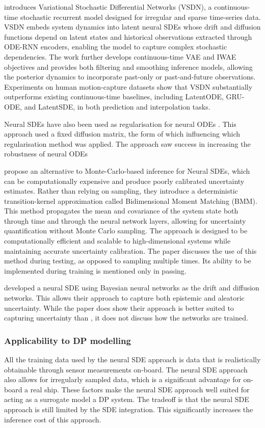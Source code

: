 \textcite{liuContinuousTimeStochasticDifferential2021} introduces Variational Stochastic Differential Networks (VSDN), a
continuous-time stochastic recurrent model designed for irregular and sparse time-series data. VSDN embeds system
dynamics into latent neural SDEs whose drift and diffusion functions depend on latent states and historical observations
extracted through ODE-RNN encoders, enabling the model to capture complex stochastic dependencies. The work further
develops continuous-time VAE and IWAE objectives and provides both filtering and smoothing inference models, allowing
the posterior dynamics to incorporate past-only or past-and-future observations. Experiments on human motion-capture
datasets show that VSDN substantially outperforms existing continuous-time baselines, including LatentODE, GRU-ODE, and
LatentSDE, in both prediction and interpolation tasks.

Neural SDEs have also been used as regularisation for neural ODEs \parencite{liuHowDoesNoise2020}. This approach used a
fixed diffusion matrix, the form of which influencing which regularisation method was applied. The approach saw success
in increasing the robustness of neural ODEs

\textcite{lookDeterministicApproximationNeural2023} propose an alternative to Monte-Carlo-based inference for Neural
SDEs, which can be computationally expensive and produce poorly calibrated uncertainty estimates. Rather than relying on
sampling, they introduce a deterministic transition-kernel approximation called Bidimensional Moment Matching (BMM).
This method propagates the mean and covariance of the system state both through time and through the neural network
layers, allowing for uncertainty quantification without Monte Carlo sampling. The approach is designed to be
computationally efficient and scalable to high-dimensional systems while maintaining accurate uncertainty calibration.
The paper discusses the use of this method during testing, as opposed to sampling multiple times. Its ability to be
implemented during training is mentioned only in passing. 

\textcite{lookDifferentialBayesianNeural2019} developed a neural SDE using Bayesian neural networks as the drift and
diffusion networks. This allows their approach to capture both epistemic and aleatoric uncertainty. While the paper does
show their approach is better suited to capturing uncertainty than \parencite{liuHowDoesNoise2020}, it does not discuss
how the networks are trained.

\subsubsection{Applicability to DP modelling}
All the training data used by the neural SDE approach is data that is realistically obtainable through sensor
measurements on-board. The neural SDE approach also allows for irregularly sampled data, which is a significant
advantage for on-board a real ship. These factors make the neural SDE approach well suited for acting as a surrogate model a DP system. The tradeoff is that the neural SDE approach is still limited by the SDE
integration. This significantly increases the inference cost of this approach. 

